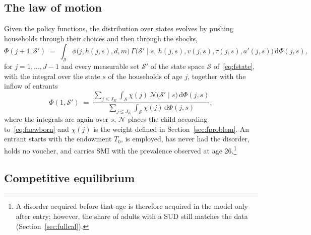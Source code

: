 \documentclass[10pt]{article}
\begin{document}
\subsection{The law of motion}\label{sec:fnewbornsec}

Given the policy functions, the distribution over states evolves by pushing
households through their choices and then through the shocks,
\begin{equation}\label{eq:flom}
\Phi(j{+}1,\mathcal S')\;=\;\int_{\mathcal S}\!\phi\big(j,h(j,s),d,m\big)\,
\Gamma\big(\mathcal S'\mid s,\,h(j,s),v(j,s),\tau(j,s),a'(j,s)\big)\,
\mathrm{d}\Phi(j,s),
\end{equation}
for $j=1,\dots,J-1$ and every measurable set $\mathcal S'$ of the state space $\mathcal S$ of~\eqref{eq:fstate}, with the integral over the state $s$ of the households of age $j$, together with the inflow of entrants
\begin{equation}\label{eq:flomnew}
\Phi(1,\mathcal S')\;=\;\frac{\sum_{j\le J_K}\int_{\mathcal S}\!\chi(j)\,
\mathcal N\big(\mathcal S'\mid s\big)\,\mathrm{d}\Phi(j,s)}
{\sum_{j\le J_K}\int_{\mathcal S}\!\chi(j)\,\mathrm{d}\Phi(j,s)},
\end{equation}
where the integrals are again over $s$, $\mathcal N$ places the child according
to~\eqref{eq:fnewborn} and $\chi(j)$ is the weight defined in Section~\ref{sec:fproblem}. An entrant starts with the endowment $T_0$, is employed, has never had the disorder, holds no voucher, and carries SMI with the prevalence observed at age 26.\footnote{A disorder acquired before that age is therefore acquired in the model only after entry; however, the share of adults with a SUD still matches the data (Section~\ref{sec:fullcal}).}

\subsection{Competitive equilibrium}
\end{document}
